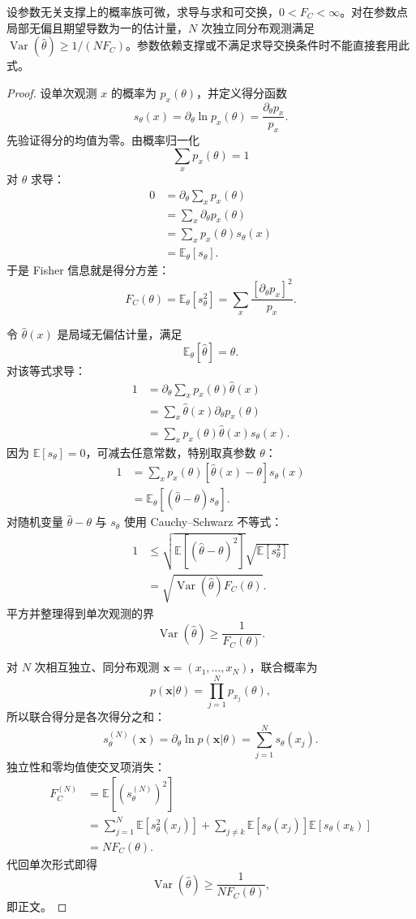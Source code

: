 \begin{theorem}
设参数无关支撑上的概率族可微，求导与求和可交换，$0<F_C<\infty$。对在参数点局部无偏且期望导数为一的估计量，$N$ 次独立同分布观测满足 $\operatorname{Var}(\hat\theta)\ge1/(NF_C)$。参数依赖支撑或不满足求导交换条件时不能直接套用此式。
\end{theorem}
\begin{proof}
设单次观测 $x$ 的概率为 $p_x(\theta)$，并定义得分函数
\[
s_\theta(x)=\partial_\theta\ln p_x(\theta)
=\frac{\partial_\theta p_x}{p_x}.
\]
先验证得分的均值为零。由概率归一化
\[
\sum_xp_x(\theta)=1
\]
对 $\theta$ 求导：
\begin{align*}
0
&=\partial_\theta\sum_xp_x(\theta)\\
&=\sum_x\partial_\theta p_x(\theta)\\
&=\sum_xp_x(\theta)s_\theta(x)\\
&=\mathbb E_\theta[s_\theta].
\end{align*}
于是 Fisher 信息就是得分方差：
\[
F_C(\theta)
=\mathbb E_\theta[s_\theta^2]
=\sum_x\frac{[\partial_\theta p_x]^2}{p_x}.
\]

令 $\hat\theta(x)$ 是局域无偏估计量，满足
\[
\mathbb E_\theta[\hat\theta]=\theta.
\]
对该等式求导：
\begin{align*}
1
&=\partial_\theta\sum_xp_x(\theta)\hat\theta(x)\\
&=\sum_x\hat\theta(x)\partial_\theta p_x(\theta)\\
&=\sum_xp_x(\theta)\hat\theta(x)s_\theta(x).
\end{align*}
因为 $\mathbb E[s_\theta]=0$，可减去任意常数，特别取真参数 $\theta$：
\begin{align*}
1
&=\sum_xp_x(\theta)[\hat\theta(x)-\theta]s_\theta(x)\\
&=\mathbb E_\theta[(\hat\theta-\theta)s_\theta].
\end{align*}
对随机变量 $\hat\theta-\theta$ 与 $s_\theta$ 使用 Cauchy--Schwarz 不等式：
\begin{align*}
1
&\le\sqrt{\mathbb E[(\hat\theta-\theta)^2]}
\sqrt{\mathbb E[s_\theta^2]}\\
&=\sqrt{\operatorname{Var}(\hat\theta)F_C(\theta)}.
\end{align*}
平方并整理得到单次观测的界
\[
\operatorname{Var}(\hat\theta)\ge\frac1{F_C(\theta)}.
\]

对 $N$ 次相互独立、同分布观测
$\mathbf x=(x_1,\ldots,x_N)$，联合概率为
\[
p(\mathbf x|\theta)=\prod_{j=1}^Np_{x_j}(\theta),
\]
所以联合得分是各次得分之和：
\[
s_\theta^{(N)}(\mathbf x)
=\partial_\theta\ln p(\mathbf x|\theta)
=\sum_{j=1}^Ns_\theta(x_j).
\]
独立性和零均值使交叉项消失：
\begin{align*}
F_C^{(N)}
&=\mathbb E[(s_\theta^{(N)})^2]\\
&=\sum_{j=1}^N\mathbb E[s_\theta^2(x_j)]
+\sum_{j\ne k}\mathbb E[s_\theta(x_j)]\mathbb E[s_\theta(x_k)]\\
&=NF_C(\theta).
\end{align*}
代回单次形式即得
\[
\operatorname{Var}(\hat\theta)
\ge\frac1{NF_C(\theta)},
\]
即正文。
\end{proof}



